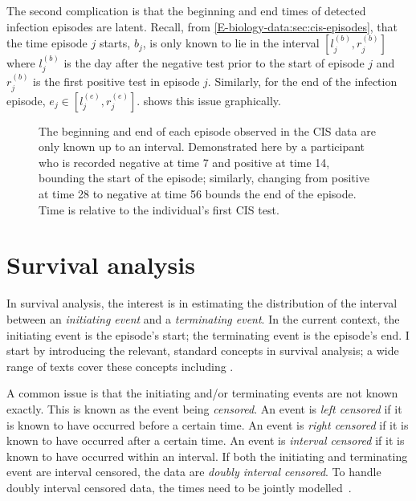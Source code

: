 \documentclass[thesis.tex]{subfiles}
\begin{document}
The second complication is that the beginning and end times of detected infection episodes are latent.
Recall, from \cref{E-biology-data:sec:cis-episodes}, that the time episode $j$ starts, $b_j$, is only known to lie in the interval $[l_j^{(b)}, r_j^{(b)}]$ where $l_j^{(b)}$ is the day after the negative test prior to the start of episode $j$ and $r_j^{(b)}$ is the first positive test in episode $j$.
Similarly, for the end of the infection episode, $e_j \in [l_j^{(e)}, r_j^{(e)}]$.
 shows this issue graphically.
\begin{figure}
  \caption[Double-interval censoring in CIS data]{%
        The beginning and end of each episode observed in the CIS data are only known up to an interval.
        Demonstrated here by a participant who is recorded negative at time 7 and positive at time 14, bounding the start of the episode; similarly, changing from positive at time 28 to negative at time 56 bounds the end of the episode.
      Time is relative to the individual's first CIS test.
    }
    \label{perf-test:fig:double-interval-censor}
\end{figure}

\section{Survival analysis} \label{perf-test:sec:surv-analysis}

In survival analysis, the interest is in estimating the distribution of the interval between an \emph{initiating event} and a \emph{terminating event}.
In the current context, the initiating event is the episode's start; the terminating event is the episode's end.
I start by introducing the relevant, standard concepts in survival analysis; a wide range of texts cover these concepts including \textcite[chapter 1]{bogaertsSurvival}.

A common issue is that the initiating and/or terminating events are not known exactly.
This is known as the event being \emph{censored}.
An event is \emph{left censored} if it is known to have occurred before a certain time.
An event is \emph{right censored} if it is known to have occurred after a certain time.
An event is \emph{interval censored} if it is known to have occurred within an interval.
If both the initiating and terminating event are interval censored, the data are \emph{doubly interval censored}.
To handle doubly interval censored data, the times need to be jointly modelled~\autocite[and references therein]{liSemiparametric}.
\end{document}
